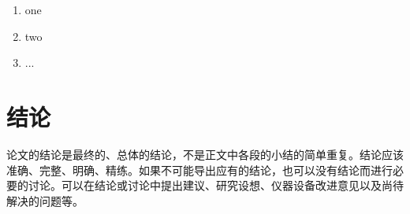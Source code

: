 \documentclass{bjtu-bachelor-thesis}
\begin{document}
\begin{enumerate}
    \item one
    \item two
    \item ...
\end{enumerate}

\chapter{结论}
论文的结论是最终的、总体的结论，不是正文中各段的小结的简单重复。结论应该准确、完整、明确、精练。如果不可能导出应有的结论，也可以没有结论而进行必要的讨论。可以在结论或讨论中提出建议、研究设想、仪器设备改进意见以及尚待解决的问题等。
\newpage
\pagestyle{myfancy}


\printbibliography[heading=myheading]
\cleardoublepage
\thankspage
{}
\appendix

\chapter*{}
\end{document}
